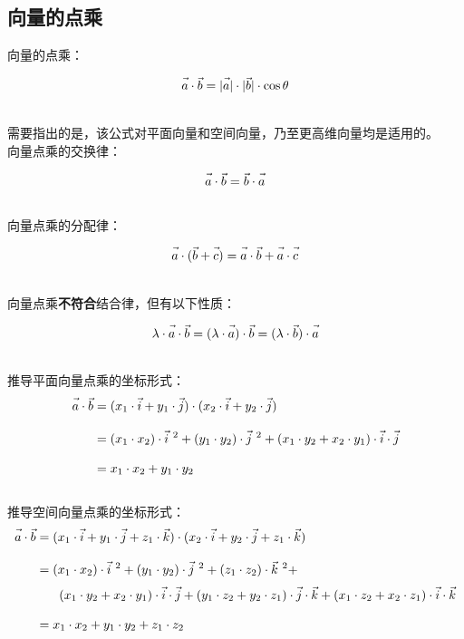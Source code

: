 \documentclass[UTF8]{ctexart}
\let\nvec\vec
\def\vec#1{\nvec{\vphantom b\smash{#1}}}
\begin{document}
\subsection{向量的点乘}
    向量的点乘：
    \begin{large}
        \begin{equation*}
            \vec{a}\cdot\vec{b}=|\vec{a}|\cdot|\vec{b}|\cdot\cos{\theta}
        \end{equation*}
    \end{large}\\
    需要指出的是，该公式对平面向量和空间向量，乃至更高维向量均是适用的。\\[6mm]
    向量点乘的交换律：
    \begin{large}
        \begin{equation*}
            \vec{a}\cdot\vec{b}=\vec{b}\cdot\vec{a}
        \end{equation*}
    \end{large}\\
    向量点乘的分配律：
    \begin{large}
        \begin{equation*}
            \vec{a}\cdot(\vec{b}+\vec{c})=\vec{a}\cdot\vec{b}+\vec{a}\cdot\vec{c}
        \end{equation*}
    \end{large}\\
    向量点乘\textbf{不符合}结合律，但有以下性质：
    \begin{large}
        \begin{equation*}
            \lambda\cdot\vec{a}\cdot\vec{b}=(\lambda\cdot\vec{a})\cdot\vec{b}=(\lambda\cdot\vec{b})\cdot\vec{a}
        \end{equation*}
    \end{large}\\
    推导平面向量点乘的坐标形式：
    \setcounter{equation}{0}
    \begin{align}
        \vec{a}\cdot\vec{b}
        &=(x_1\cdot\vec{i}+y_1\cdot\vec{j})\cdot(x_2\cdot\vec{i}+y_2\cdot\vec{j})\\[3mm]
        &=(x_1\cdot x_2)\cdot\vec{i}~^2+(y_1\cdot y_2)\cdot\vec{j}~^2+(x_1\cdot y_2+x_2\cdot y_1)\cdot\vec{i}\cdot\vec{j}\\[3mm]
        &=x_1\cdot x_2+y_1\cdot y_2
    \end{align}\\
    推导空间向量点乘的坐标形式：
    \setcounter{equation}{0}
    \begin{align}
        \vec{a}\cdot\vec{b}
        &=(x_1\cdot\vec{i}+y_1\cdot\vec{j}+z_1\cdot\vec{k})\cdot(x_2\cdot\vec{i}+y_2\cdot\vec{j}+z_1\cdot\vec{k})\\[3mm]
        &=(x_1\cdot x_2)\cdot\vec{i}~^2+(y_1\cdot y_2)\cdot\vec{j}~^2+(z_1\cdot z_2)\cdot\vec{k}~^2+\\[1mm]
        &~~~~~\,(x_1\cdot y_2+x_2\cdot y_1)\cdot\vec{i}\cdot\vec{j}+(y_1\cdot z_2+y_2\cdot z_1)\cdot\vec{j}\cdot\vec{k}+(x_1\cdot z_2+x_2\cdot z_1)\cdot\vec{i}\cdot\vec{k}\\[3mm]
        &=x_1\cdot x_2+y_1\cdot y_2+z_1\cdot z_2
    \end{align}
\end{document}
